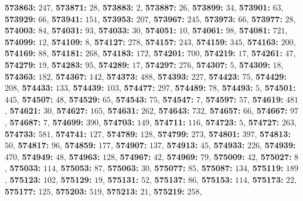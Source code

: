 \textsf{\bfseries 573863:} $247$, \textsf{\bfseries 573871:} $28$, \textsf{\bfseries 573883:} $2$, \textsf{\bfseries 573887:} $26$, \textsf{\bfseries 573899:} $34$, \textsf{\bfseries 573901:} $63$, \textsf{\bfseries 573929:} $66$, \textsf{\bfseries 573941:} $151$, \textsf{\bfseries 573953:} $207$, \textsf{\bfseries 573967:} $245$, \textsf{\bfseries 573973:} $66$, \textsf{\bfseries 573977:} $28$, \textsf{\bfseries 574003:} $84$, \textsf{\bfseries 574031:} $93$, \textsf{\bfseries 574033:} $30$, \textsf{\bfseries 574051:} $10$, \textsf{\bfseries 574061:} $98$, \textsf{\bfseries 574081:} $721$, \textsf{\bfseries 574099:} $12$, \textsf{\bfseries 574109:} $8$, \textsf{\bfseries 574127:} $278$, \textsf{\bfseries 574157:} $243$, \textsf{\bfseries 574159:} $345$, \textsf{\bfseries 574163:} $200$, \textsf{\bfseries 574169:} $88$, \textsf{\bfseries 574181:} $268$, \textsf{\bfseries 574183:} $172$, \textsf{\bfseries 574201:} $700$, \textsf{\bfseries 574219:} $17$, \textsf{\bfseries 574261:} $47$, \textsf{\bfseries 574279:} $19$, \textsf{\bfseries 574283:} $95$, \textsf{\bfseries 574289:} $17$, \textsf{\bfseries 574297:} $276$, \textsf{\bfseries 574307:} $5$, \textsf{\bfseries 574309:} $18$, \textsf{\bfseries 574363:} $182$, \textsf{\bfseries 574367:} $142$, \textsf{\bfseries 574373:} $488$, \textsf{\bfseries 574393:} $227$, \textsf{\bfseries 574423:} $75$, \textsf{\bfseries 574429:} $208$, \textsf{\bfseries 574433:} $133$, \textsf{\bfseries 574439:} $103$, \textsf{\bfseries 574477:} $297$, \textsf{\bfseries 574489:} $78$, \textsf{\bfseries 574493:} $5$, \textsf{\bfseries 574501:} $445$, \textsf{\bfseries 574507:} $48$, \textsf{\bfseries 574529:} $65$, \textsf{\bfseries 574543:} $75$, \textsf{\bfseries 574547:} $7$, \textsf{\bfseries 574597:} $57$, \textsf{\bfseries 574619:} $481$, \textsf{\bfseries 574621:} $30$, \textsf{\bfseries 574627:} $165$, \textsf{\bfseries 574631:} $262$, \textsf{\bfseries 574643:} $732$, \textsf{\bfseries 574657:} $66$, \textsf{\bfseries 574667:} $97$, \textsf{\bfseries 574687:} $7$, \textsf{\bfseries 574699:} $390$, \textsf{\bfseries 574703:} $149$, \textsf{\bfseries 574711:} $116$, \textsf{\bfseries 574723:} $5$, \textsf{\bfseries 574727:} $263$, \textsf{\bfseries 574733:} $581$, \textsf{\bfseries 574741:} $127$, \textsf{\bfseries 574789:} $128$, \textsf{\bfseries 574799:} $273$, \textsf{\bfseries 574801:} $397$, \textsf{\bfseries 574813:} $50$, \textsf{\bfseries 574817:} $96$, \textsf{\bfseries 574859:} $177$, \textsf{\bfseries 574907:} $137$, \textsf{\bfseries 574913:} $45$, \textsf{\bfseries 574933:} $226$, \textsf{\bfseries 574939:} $470$, \textsf{\bfseries 574949:} $48$, \textsf{\bfseries 574963:} $128$, \textsf{\bfseries 574967:} $42$, \textsf{\bfseries 574969:} $79$, \textsf{\bfseries 575009:} $42$, \textsf{\bfseries 575027:} $8$, \textsf{\bfseries 575033:} $114$, \textsf{\bfseries 575053:} $87$, \textsf{\bfseries 575063:} $30$, \textsf{\bfseries 575077:} $85$, \textsf{\bfseries 575087:} $134$, \textsf{\bfseries 575119:} $189$, \textsf{\bfseries 575123:} $102$, \textsf{\bfseries 575129:} $19$, \textsf{\bfseries 575131:} $52$, \textsf{\bfseries 575137:} $86$, \textsf{\bfseries 575153:} $114$, \textsf{\bfseries 575173:} $22$, \textsf{\bfseries 575177:} $125$, \textsf{\bfseries 575203:} $519$, \textsf{\bfseries 575213:} $21$, \textsf{\bfseries 575219:} $258$, 
